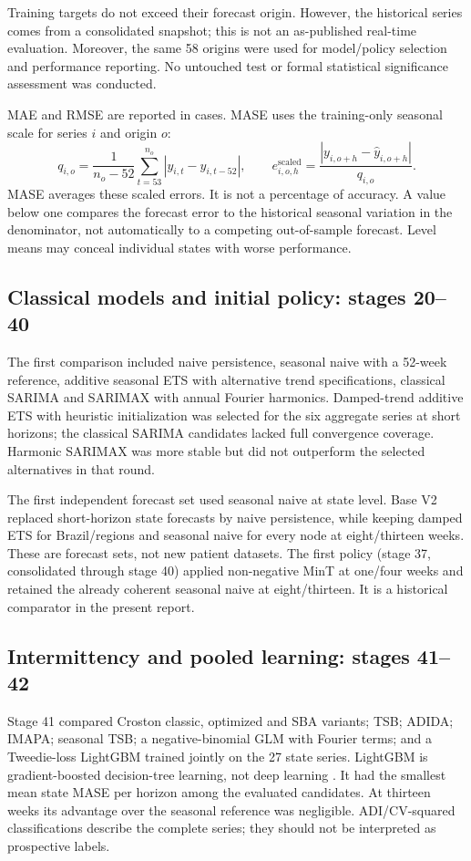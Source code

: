 \documentclass[12pt,a4paper]{article}
\begin{document}
Training targets do not exceed their forecast origin. However, the historical series comes from a consolidated snapshot; this is not an as-published real-time evaluation. Moreover, the same 58 origins were used for model/policy selection and performance reporting. No untouched test or formal statistical significance assessment was conducted.

MAE and RMSE are reported in cases. MASE uses the training-only seasonal scale for series $i$ and origin $o$:
\begin{equation}
q_{i,o}=\frac{1}{n_o-52}\sum_{t=53}^{n_o}|y_{i,t}-y_{i,t-52}|,
\qquad e^{\mathrm{scaled}}_{i,o,h}=\frac{|y_{i,o+h}-\hat y_{i,o+h}|}{q_{i,o}}.
\end{equation}
MASE averages these scaled errors. It is not a percentage of accuracy. A value below one compares the forecast error to the historical seasonal variation in the denominator, not automatically to a competing out-of-sample forecast. Level means may conceal individual states with worse performance.

\subsection{Classical models and initial policy: stages 20--40}
The first comparison included naive persistence, seasonal naive with a 52-week reference, additive seasonal ETS with alternative trend specifications, classical SARIMA and SARIMAX with annual Fourier harmonics. Damped-trend additive ETS with heuristic initialization was selected for the six aggregate series at short horizons; the classical SARIMA candidates lacked full convergence coverage. Harmonic SARIMAX was more stable but did not outperform the selected alternatives in that round.

The first independent forecast set used seasonal naive at state level. Base V2 replaced short-horizon state forecasts by naive persistence, while keeping damped ETS for Brazil/regions and seasonal naive for every node at eight/thirteen weeks. These are forecast sets, not new patient datasets. The first policy (stage 37, consolidated through stage 40) applied non-negative MinT at one/four weeks and retained the already coherent seasonal naive at eight/thirteen. It is a historical comparator in the present report.

\subsection{Intermittency and pooled learning: stages 41--42}
Stage 41 compared Croston classic, optimized and SBA variants; TSB; ADIDA; IMAPA; seasonal TSB; a negative-binomial GLM with Fourier terms; and a Tweedie-loss LightGBM trained jointly on the 27 state series. LightGBM is gradient-boosted decision-tree learning, not deep learning \cite{lgbm}. It had the smallest mean state MASE per horizon among the evaluated candidates. At thirteen weeks its advantage over the seasonal reference was negligible. ADI/CV-squared classifications describe the complete series; they should not be interpreted as prospective labels.
\end{document}
